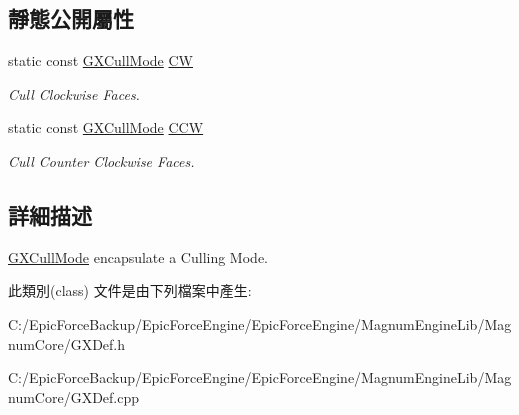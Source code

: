 \subsection*{靜態公開屬性}
\begin{DoxyCompactItemize}
\item 
static const \hyperlink{class_magnum_1_1_g_x_cull_mode}{G\+X\+Cull\+Mode} \hyperlink{class_magnum_1_1_g_x_cull_mode_ad519141ccdacd7d740e82e1406172a7e}{CW}\hypertarget{class_magnum_1_1_g_x_cull_mode_ad519141ccdacd7d740e82e1406172a7e}{}\label{class_magnum_1_1_g_x_cull_mode_ad519141ccdacd7d740e82e1406172a7e}

\begin{DoxyCompactList}\small\item\em Cull Clockwise Faces. \end{DoxyCompactList}\item 
static const \hyperlink{class_magnum_1_1_g_x_cull_mode}{G\+X\+Cull\+Mode} \hyperlink{class_magnum_1_1_g_x_cull_mode_acfa9e73a89184d8da45f63ae701294c9}{C\+CW}\hypertarget{class_magnum_1_1_g_x_cull_mode_acfa9e73a89184d8da45f63ae701294c9}{}\label{class_magnum_1_1_g_x_cull_mode_acfa9e73a89184d8da45f63ae701294c9}

\begin{DoxyCompactList}\small\item\em Cull Counter Clockwise Faces. \end{DoxyCompactList}\end{DoxyCompactItemize}


\subsection{詳細描述}
\hyperlink{class_magnum_1_1_g_x_cull_mode}{G\+X\+Cull\+Mode} encapsulate a Culling Mode. 

此類別(class) 文件是由下列檔案中產生\+:\begin{DoxyCompactItemize}
\item 
C\+:/\+Epic\+Force\+Backup/\+Epic\+Force\+Engine/\+Epic\+Force\+Engine/\+Magnum\+Engine\+Lib/\+Magnum\+Core/G\+X\+Def.\+h\item 
C\+:/\+Epic\+Force\+Backup/\+Epic\+Force\+Engine/\+Epic\+Force\+Engine/\+Magnum\+Engine\+Lib/\+Magnum\+Core/G\+X\+Def.\+cpp\end{DoxyCompactItemize}
